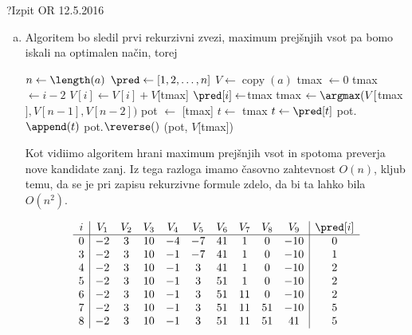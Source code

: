 \begin{naloga}{?}{Izpit OR 12.5.2016}
\begin{odgovor}
\begin{enumerate}[(a)]
\item Algoritem bo sledil prvi rekurzivni zvezi, 
maximum prejšnjih vsot pa bomo iskali na optimalen način, torej
\begin{small}
\begin{algorithmic}
	\State $n \gets \length(a)$
	\State $\pred \gets [1, 2, \dots, n]$
	\State $V \gets \operatorname{copy}(a)$
	\State tmax $\gets 0$
			\State tmax $\gets i - 2$
		\EndIf
			\State $V[i] \gets  V[i] + V$[tmax]
			\State $\pred[i] \gets $tmax
		\EndIf
	\EndFor
	\State tmax $\gets \argmax(V[$tmax$], V[n-1], V[n-2])$
	\State pot $\gets$ [tmax]
	\State $t \gets$ tmax
		\State $t \gets \pred[t]$
		\State pot.$\append(t)$
	\EndWhile
	\State pot.$\reverse()$
	\State \Return (pot, $V$[tmax])
\EndFunction
\end{algorithmic}
\end{small}
Kot vidiimo algoritem hrani maximum prejšnjih vsot in spotoma preverja nove kandidate zanj.
Iz tega razloga imamo časovno zahtevnost $O(n)$,
kljub temu, da se je pri zapisu rekurzivne formule zdelo,
da bi ta lahko bila $O(n^2)$.

\begin{tabela}
$$
\begin{array}{c|ccccccccc|c}
i & V_1 & V_2 & V_3 & V_4 & V_5 & V_6 & V_7 & V_8 & V_9 & \pred[i]  \\ \hline
0 & -2 & 3 & 10 & -4 & -7 & 41 & 1 & 0 & -10 & 0 \\
3 & -2 & 3 & 10 & -1 & -7 & 41 & 1 & 0 & -10 & 1 \\
4 & -2 & 3 & 10 & -1 & 3 & 41 & 1 & 0 & -10 & 2 \\
5 & -2 & 3 & 10 & -1 & 3 & 51 & 1 & 0 & -10 & 2 \\
6 & -2 & 3 & 10 & -1 & 3 & 51 & 11 & 0 & -10 & 2 \\
7 & -2 & 3 & 10 & -1 & 3 & 51 & 11 & 51 & -10 & 5 \\
8 & -2 & 3 & 10 & -1 & 3 & 51 & 11 & 51 & 41 & 5 \\
\end{array}
$$
\end{tabela}

\end{enumerate}

\end{odgovor}
\end{naloga}
